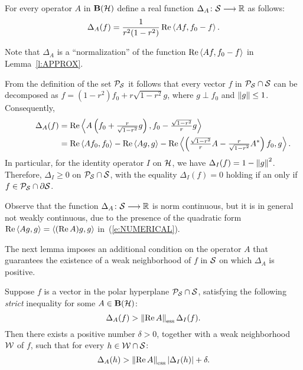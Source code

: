 \smallskip

\begin{defn}
For every operator $A$ in $\mathbf B(\cal H)$ define a real function
$\Delta_A\colon{\cal S}\longrightarrow\mathbb R$ as follows:
\[ \Delta_A(f) = \frac{1}{r^2(1-r^2)}\operatorname{Re}\left<A{}f, f_0-f\right>. \]
\end{defn}

\begin{rem}
Note that $\Delta_A$ is a ``normalization'' of the function
$\operatorname{Re}\left<A{}f, f_0-f\right>$ in Lemma~\ref{l:APPROX}.

From the definition of the set ${\cal P}_{{\cal S}}$ it follows that every
vector $f$ in ${\cal P}_{{\cal S}}\cap{\cal S}$ can be decomposed as $f=(1-r^2)f_0
+ r\sqrt{1-r^2} g$, where $g \perp f_0$ and $\left\Vert g\right\Vert\leq 1$.
Consequently,
\begin{equation}\label{e:NUMERICAL}
\begin{split}
 ~~ \quad ~~
 \Delta_A(f) &= \operatorname{Re}\left<A\left(f_0+\tfrac{r}{\sqrt{1-r^2}}g\right),
                      f_0-\tfrac{\sqrt{1-r^2}}{r}g\right>\\
           &= \operatorname{Re}\left<A f_0, f_0\right> - \operatorname{Re}\left<A g, g\right> -
              \operatorname{Re}\left<\left(\tfrac{\sqrt{1-r^2}}{r}A
                           -\tfrac{r}{\sqrt{1-r^2}}A^*\right) f_0, g\right>.
\end{split}
\end{equation}
In particular, for the identity operator $I$ on ${\cal H}$, we have
$\Delta_I(f) = 1 - \left\Vert g\right\Vert^2$. Therefore, $\Delta_I\geq0$ on
${\cal P}_{{\cal S}}\cap{\cal S}$, with the equality $\Delta_I(f)=0$ holding if an
only if $f\in{\cal P}_{{\cal S}}\cap\partial{\cal S}$.

Observe that the function $\Delta_A\colon{\cal S}\longrightarrow\mathbb R$ is norm
continuous, but it is in general not weakly continuous, due to
the presence of the quadratic form $\operatorname{Re}\left<A g,g\right> =
\left<(\operatorname{Re}{A})g, g\right>$ in~(\ref{e:NUMERICAL}).
\end{rem}

\smallskip

The next lemma imposes an additional condition on the operator
$A$ that guarantees the existence of a weak neighborhood of $f$
in ${\cal S}$ on which $\Delta_A$ is positive.

\begin{lem} \label{l:ESS}
Suppose $f$ is a vector in the polar hyperplane ${\cal P}_{{\cal S}}\cap{\cal S}$,
satisfying the following {\em strict} inequality for some $A
\in \mathbf B(\cal H)$:
\[ \Delta_A(f) > \essnorm{\RE{}A} \Delta_I(f). \]
Then there exists a positive number $\delta>0$, together with a
weak neighborhood ${\cal W}$ of $f$, such that for every
$h\in{\cal W}\cap{\cal S}$:
\[ \Delta_A(h) > \essnorm{\RE{}A}\abs{\Delta_I(h)} + \delta. \]
\end{lem}

